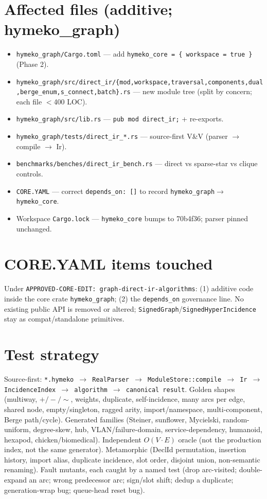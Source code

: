\documentclass[11pt]{article}
\begin{document}
\section{Affected files (additive; hymeko\_graph)}
\begin{itemize}[nosep]
  \item \texttt{hymeko\_graph/Cargo.toml} --- add \texttt{hymeko\_core = \{ workspace = true \}} (Phase 2).
  \item \texttt{hymeko\_graph/src/direct\_ir/\{mod,workspace,traversal,components,dual,berge\_enum,s\_connect,batch\}.rs}
        --- new module tree (split by concern; each file $<$400 LOC).
  \item \texttt{hymeko\_graph/src/lib.rs} --- \texttt{pub mod direct\_ir;} + re-exports.
  \item \texttt{hymeko\_graph/tests/direct\_ir\_*.rs} --- source-first V\&V (parser $\to$ compile $\to$ Ir).
  \item \texttt{benchmarks/benches/direct\_ir\_bench.rs} --- direct vs sparse-star vs clique controls.
  \item \texttt{CORE.YAML} --- correct \texttt{depends\_on: []} to record \texttt{hymeko\_graph$\to$hymeko\_core}.
  \item Workspace \texttt{Cargo.lock} --- \texttt{hymeko\_core} bumps to 70b4f36; parser pinned unchanged.
\end{itemize}

\section{CORE.YAML items touched}
Under \texttt{APPROVED-CORE-EDIT: graph-direct-ir-algorithms}: (1) additive code inside the core crate
\texttt{hymeko\_graph}; (2) the \texttt{depends\_on} governance line. No existing public API is removed or
altered; \texttt{SignedGraph}/\texttt{SignedHyperIncidence} stay as compat/standalone primitives.

\section{Test strategy}
Source-first: \texttt{*.hymeko $\to$ RealParser $\to$ ModuleStore::compile $\to$ Ir $\to$ IncidenceIndex $\to$
algorithm $\to$ canonical result}. Golden shapes (multiway, $+/-/\sim$, weights, duplicate, self-incidence,
many arcs per edge, shared node, empty/singleton, ragged arity, import/namespace, multi-component, Berge
path/cycle). Generated families (Steiner, sunflower, Mycielski, random-uniform, degree-skew, hub,
VLAN/failure-domain, service-dependency, humanoid, hexapod, chicken/biomedical). Independent $O(V\cdot E)$
oracle (not the production index, not the same generator). Metamorphic (DeclId permutation, insertion
history, import alias, duplicate incidence, slot order, disjoint union, non-semantic renaming). Fault
mutants, each caught by a named test (drop arc-visited; double-expand an arc; wrong predecessor arc;
sign/slot shift; dedup a duplicate; generation-wrap bug; queue-head reset bug).
\end{document}
